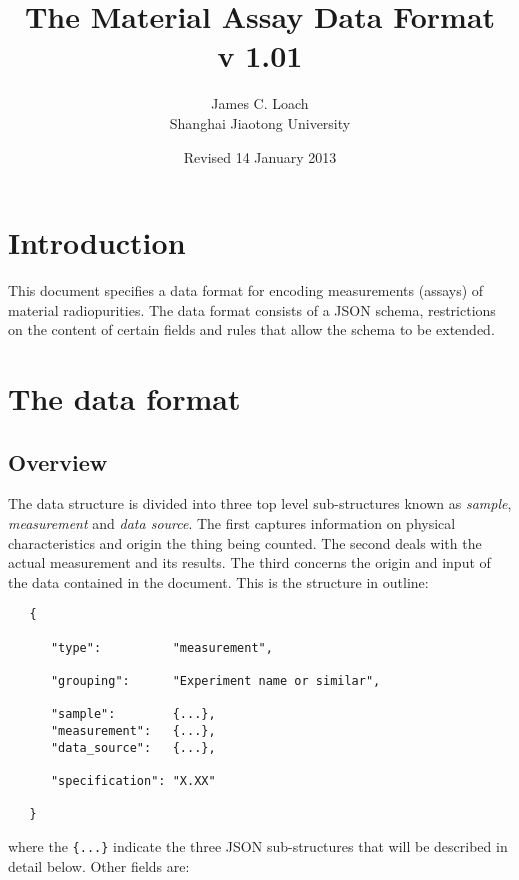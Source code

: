 \documentclass[11pt, letterpaper]{article}
\begin{document}
 
\title{The Material Assay Data Format \\ v 1.01}
\author{James C. Loach \\ Shanghai Jiaotong University}
\date{Revised 14 January 2013}



\maketitle 
 
\section{Introduction}

This document specifies a data format for encoding measurements (assays) of material radiopurities. The data format consists of a JSON schema, restrictions on the content of certain fields and rules that allow the schema to be extended.

\section{The data format}

\subsection{Overview} 

The data structure is divided into three top level sub-structures known as \textit{sample}, \textit{measurement} and \textit{data source}. The first captures information on physical characteristics and origin the thing being counted. The second deals with the actual measurement and its results. The third concerns the origin and input of the data contained in the document. This is the structure in outline:

\begin{small}
\begin{verbatim}
   {

      "type":          "measurement",

      "grouping":      "Experiment name or similar", 
      
      "sample":        {...},  
      "measurement":   {...},   
      "data_source":   {...},   
 
      "specification": "X.XX"

   }
\end{verbatim}
\end{small}
where the \verb|{...}| indicate the three JSON sub-structures that will be described in detail below. Other fields are:
\end{document}
